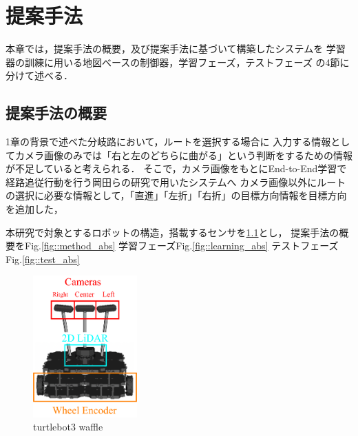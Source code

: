 \chapter{提案手法}\label{chap:method}
本章では，提案手法の概要，及び提案手法に基づいて構築したシステムを
学習器の訓練に用いる地図べースの制御器，学習フェーズ，テストフェーズ
の4節に分けて述べる．

\section{提案手法の概要}

1章の背景で述べた分岐路において，ルートを選択する場合に
入力する情報としてカメラ画像のみでは「右と左のどちらに曲がる」という判断をするための情報が不足していると考えられる．
そこで，カメラ画像をもとにEnd-to-End学習で経路追従行動を行う岡田らの研究\cite{okada}で用いたシステムへ
カメラ画像以外にルートの選択に必要な情報として，「直進」「左折」「右折」の目標方向情報を目標方向を追加した，

本研究で対象とするロボットの構造，搭載するセンサを\ref{fig::turtlebot3_gazo}とし，
提案手法の概要をFig.\ref{fig::method_abs}
学習フェーズFig.\ref{fig::learning_abs}
テストフェーズFig.\ref{fig::test_abs}



\begin{figure}[H]
    \centering
    \includegraphics[width = 4cm]{./figs/turtlebot3_kame.pdf}
    \caption{turtlebot3 waffle}
    \label{fig::turtlebot3_gazo}
\end{figure}



